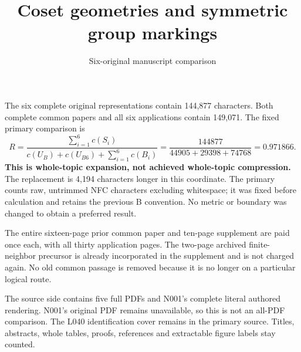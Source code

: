 \documentclass[11pt,a4paper]{article}
\title{Coset geometries and symmetric group markings}
\author{Six-original manuscript comparison}\date{}
\begin{document}
\maketitle
The six complete original representations contain 144,877 characters. Both complete common papers and all six applications contain 149,071. The fixed primary comparison is
\[
 R=\frac{\sum_{i=1}^6c(S_i)}{c(U_B)+c(U_{B6})+\sum_{i=1}^6c(B_i)}
 =\frac{144877}{44905+29398+74768}
 =\mathbf{0.971866}.
\]
\textbf{This is whole-topic expansion, not achieved whole-topic compression.}
The replacement is 4,194 characters longer in this coordinate. The primary counts raw, untrimmed NFC characters excluding whitespace; it was fixed before calculation and retains the previous B convention. No metric or boundary was changed to obtain a preferred result.

The entire sixteen-page prior common paper and ten-page supplement are paid once each, with all thirty application pages. The two-page archived finite-neighbor precursor is already incorporated in the supplement and is not charged again. No old common passage is removed because it is no longer on a particular logical route.

The source side contains five full PDFs and N001's complete literal authored rendering. N001's original PDF remains unavailable, so this is not an all-PDF comparison. The L040 identification cover remains in the primary source. Titles, abstracts, whole tables, proofs, references and extractable figure labels stay counted.
\end{document}
